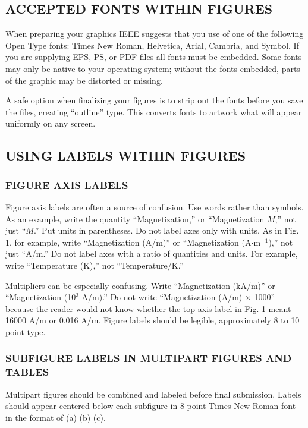 \documentclass{IEEEjmw}
\begin{document}
\subsection{ACCEPTED FONTS WITHIN FIGURES}

When preparing your graphics IEEE suggests that you use of one of the following Open Type fonts: Times New Roman, Helvetica, Arial, Cambria, and Symbol. If you are supplying EPS, PS, or PDF files all fonts must be embedded. Some fonts may only be native to your operating system; without the fonts embedded, parts of the graphic may be distorted or missing.

A safe option when finalizing your figures is to strip out the fonts before you save the files, creating ``outline'' type. This converts fonts to artwork what will appear uniformly on any screen.

\subsection{USING LABELS WITHIN FIGURES}

\subsubsection{FIGURE AXIS LABELS}

Figure axis labels are often a source of confusion. Use words rather than symbols. As an example, write the quantity ``Magnetization,'' or ``Magnetization $M$,'' not just ``$M$.'' Put units in parentheses. Do not label axes only with units. As in Fig. 1, for example, write ``Magnetization (A/m)'' or ``Magnetization (A$\cdot$m$^{-1}$),'' not just ``A/m.'' Do not label axes with a ratio of quantities and units. For example, write ``Temperature (K),'' not ``Temperature/K.''
 
Multipliers can be especially confusing. Write ``Magnetization (kA/m)'' or ``Magnetization (10$^3$ A/m).'' Do not write ``Magnetization (A/m) $\times$ 1000'' because the reader would not know whether the top axis label in Fig. 1 meant 16000 A/m or 0.016 A/m. Figure labels should be legible, approximately 8 to 10 point type.

\subsubsection{SUBFIGURE LABELS IN MULTIPART FIGURES AND TABLES}

Multipart figures should be combined and labeled before final submission. Labels should appear centered below each subfigure in 8 point Times New Roman font in the format of (a) (b) (c). 
\end{document}
